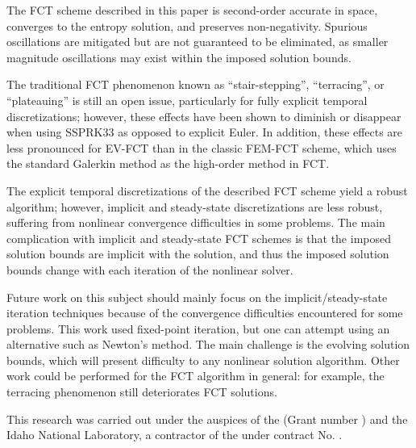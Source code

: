 \documentclass[xchauthor,chkrefs,fixeqskip,GCNS,amsmath,amsthm]{yjcphg}
\theoremstyle{remark}
\begin{document}
The FCT scheme described in this paper is second-order accurate in
space, converges to the entropy solution, and preserves non-negativity.
Spurious oscillations are mitigated but are not guaranteed to be
eliminated, as smaller magnitude oscillations may exist within the
imposed solution bounds.

The traditional FCT phenomenon known as ``stair-stepping'',
``terracing'', or ``plateauing'' is still an open issue, particularly
for fully explicit temporal discretizations; however, these effects have
been shown to diminish or disappear when using SSPRK33 as opposed to
explicit Euler. In addition, these effects are less pronounced for
EV-FCT than in the classic FEM-FCT scheme, which uses the standard
Galerkin method as the high-order method in FCT.

The explicit temporal discretizations of the described FCT scheme yield
a robust algorithm; however, implicit and steady-state discretizations
are less robust, suffering from nonlinear convergence difficulties in
some problems. The main complication with implicit and steady-state FCT
schemes is that the imposed solution bounds are implicit with the
solution, and thus the imposed solution bounds change with each
iteration of the nonlinear solver.

Future work on this subject should mainly focus on the
implicit/steady-state iteration techniques because of the convergence
difficulties encountered for some problems. This work used fixed-point
iteration, but one can attempt using an alternative such as Newton's
method. The main challenge is the evolving solution bounds, which will
present difficulty to any nonlinear solution algorithm. Other work could
be performed for the FCT algorithm in general: for example, the
terracing phenomenon still deteriorates FCT solutions.

\begin{acks}
This research was carried out under the auspices of the  (Grant number ) and the Idaho National
Laboratory, a contractor of the  under contract No.
.
\end{acks}
\end{document}
